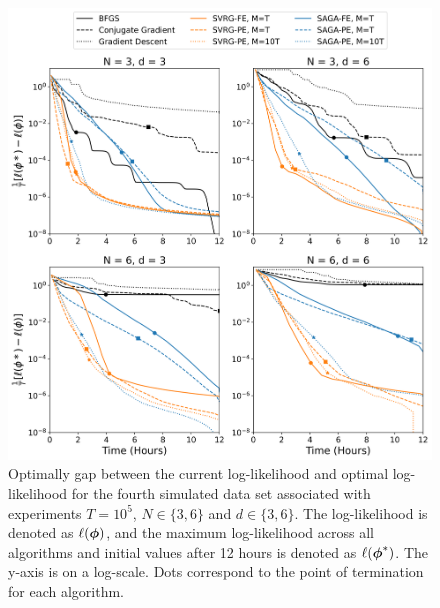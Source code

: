 \documentclass[12pt]{article}
\begin{document}
\begin{figure}[H]
    \centering
    \includegraphics[width=6.5in]{../plt/log-like_v_time_T-100000-003.png}
    \caption{Optimally gap between the current log-likelihood and optimal log-likelihood for the fourth simulated data set associated with experiments $T=10^{5}$, $N \in \{3,6\}$ and $d \in \{3,6\}$. The log-likelihood is denoted as $\ell(\boldsymbol{\phi})$, and the maximum log-likelihood across all algorithms and initial values after 12 hours is denoted as $\ell(\boldsymbol{\phi}^*)$. The y-axis is on a log-scale. Dots correspond to the point of termination for each algorithm.}
\end{figure}
%
\end{document}
